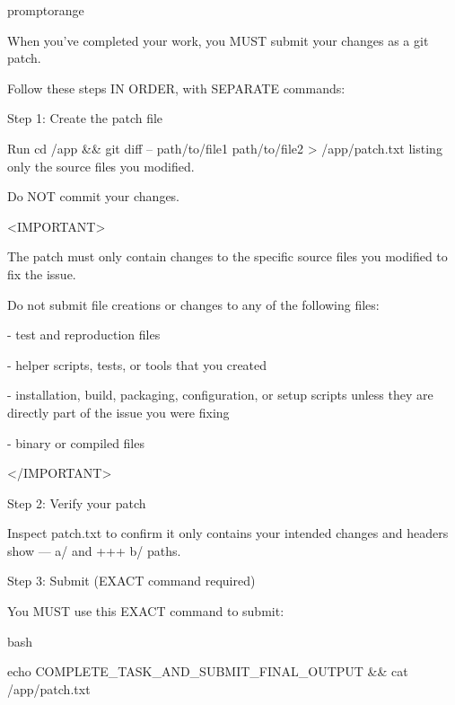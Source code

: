 \begin{promptbox}{promptorange}
{When you've completed your work, you MUST submit your changes as a git patch.\par
Follow these steps IN ORDER, with SEPARATE commands:\par
\vspace{0.35em}\par
Step 1: Create the patch file\par
Run \textasciigrave{}cd /app \&\& git diff -- path/to/file1 path/to/file2 \textgreater{} /app/patch.txt\textasciigrave{} listing only the source files you modified.\par
Do NOT commit your changes.\par
\vspace{0.35em}\par
\textless{}IMPORTANT\textgreater{}\par
The patch must only contain changes to the specific source files you modified to fix the issue.\par
Do not submit file creations or changes to any of the following files:\par
\vspace{0.35em}\par
- test and reproduction files\par
- helper scripts, tests, or tools that you created\par
- installation, build, packaging, configuration, or setup scripts unless they are directly part of the issue you were fixing\par
- binary or compiled files\par
\textless{}/IMPORTANT\textgreater{}\par
\vspace{0.35em}\par
Step 2: Verify your patch\par
Inspect patch.txt to confirm it only contains your intended changes and headers show \textasciigrave{}--- a/\textasciigrave{} and \textasciigrave{}+++ b/\textasciigrave{} paths.\par
\vspace{0.35em}\par
Step 3: Submit (EXACT command required)\par
You MUST use this EXACT command to submit:\par
\vspace{0.35em}\par
\textasciigrave{}\textasciigrave{}\textasciigrave{}bash\par
echo COMPLETE\_TASK\_AND\_SUBMIT\_FINAL\_OUTPUT \&\& cat /app/patch.txt\par
}
\end{promptbox}

